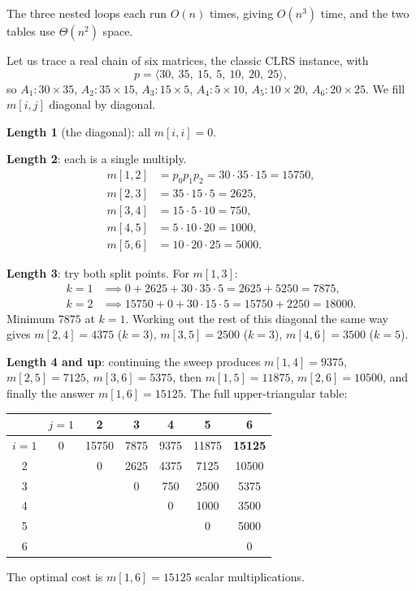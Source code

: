 The three nested loops each run $O(n)$ times, giving $O(n^3)$ time, and the two
tables use $\Theta(n^2)$ space.

\begin{labbox}
Let us trace a real chain of six matrices, the classic CLRS instance, with
\[
  p = \langle 30,\ 35,\ 15,\ 5,\ 10,\ 20,\ 25 \rangle,
\]
so $A_1:30\times35$, $A_2:35\times15$, $A_3:15\times5$, $A_4:5\times10$,
$A_5:10\times20$, $A_6:20\times25$. We fill $m[i,j]$ diagonal by diagonal.

\textbf{Length 1} (the diagonal): all $m[i,i] = 0$.

\textbf{Length 2}: each is a single multiply.
\begin{align*}
m[1,2] &= p_0 p_1 p_2 = 30\cdot35\cdot15 = 15750,\\
m[2,3] &= 35\cdot15\cdot5 = 2625,\\
m[3,4] &= 15\cdot5\cdot10 = 750,\\
m[4,5] &= 5\cdot10\cdot20 = 1000,\\
m[5,6] &= 10\cdot20\cdot25 = 5000.
\end{align*}

\textbf{Length 3}: try both split points. For $m[1,3]$:
\begin{align*}
  k=1 &\implies 0 + 2625 + 30\cdot35\cdot5 = 2625+5250 = 7875, \\
  k=2 &\implies 15750 + 0 + 30\cdot15\cdot5 = 15750+2250=18000.
\end{align*}
Minimum $7875$ at $k=1$.
Working out the rest of this diagonal the same way gives
$m[2,4]=4375$ ($k{=}3$), $m[3,5]=2500$ ($k{=}3$), $m[4,6]=3500$ ($k{=}5$).

\textbf{Length 4 and up}: continuing the sweep produces
$m[1,4]=9375$, $m[2,5]=7125$, $m[3,6]=5375$, then
$m[1,5]=11875$, $m[2,6]=10500$, and finally the answer $m[1,6]=15125$.
The full upper-triangular table:
\begin{center}
\begin{tabular}{c|cccccc}
 & $j{=}1$ & 2 & 3 & 4 & 5 & 6 \\
\hline
$i{=}1$ & 0 & 15750 & 7875 & 9375 & 11875 & \textbf{15125} \\
2 & & 0 & 2625 & 4375 & 7125 & 10500 \\
3 & & & 0 & 750 & 2500 & 5375 \\
4 & & & & 0 & 1000 & 3500 \\
5 & & & & & 0 & 5000 \\
6 & & & & & & 0 \\
\end{tabular}
\end{center}
The optimal cost is $m[1,6] = 15125$ scalar multiplications.
\end{labbox}


